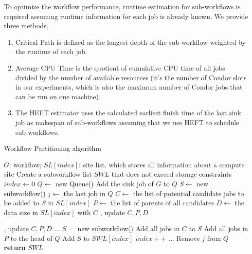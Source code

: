 To optimize the workflow performance, runtime estimation for sub-workflows is required assuming runtime information for each job is already known. We provide three methods. 
\begin{enumerate}
\item Critical Path is defined as the longest depth of the sub-workflow weighted by the runtime of each job. 
\item Average CPU Time is the quotient of cumulative CPU time of all jobs divided by the number of available resources (it’s the number of Condor slots in our experiments, which is also the maximum number of Condor jobs that can be run on one machine). \item The HEFT estimator uses the calculated earliest finish time of the last sink job as makespan of sub-workflows assuming that we use HEFT to schedule sub-workflows. 
\end{enumerate}

\begin{algorithm}[h!]
\caption{Workflow Partitioning algorithm}
\label{alg:parworkflow}
\begin{algorithmic}[1]
\Require $G$: workflow; $SL[index]$: site list, which stores all information about a compute site
\Ensure Create a subworkflow list $SWL$ that does not exceed storage constraints
   \State $index\gets 0$
   \State $Q\gets$ new Queue()
   \State Add the sink job of $G$ to $Q$
   \State $S\gets$ new subworkflow()
      \State $j\gets$ the last job in $Q$
      \State {} 
      \State $C\gets$ the list of potential candidate jobs to be added to $S$ in $SL[index]$
      \State $P\gets$ the list of parents of all candidates
      \State $D\gets$ the data size in $SL[index]$ with $C$
         \State {}, update $C,P,D$
      
         \State {}, update $C,P,D$
      \EndIf
      \EndIf
	\State ...
         \State$S=$ new subworkflow()
      \EndIf
     \State Add all jobs in $C$ to $S$
     \State Add all jobs in $P$ to the head of $Q$
     \State Add $S$ to $SWL[index]$
         \State $index++$
      \EndIf
   \State ... 
   \State Remove $j$ from $Q$
   \EndWhile
   \State \textbf{return }$SWL$

\EndProcedure
\end{algorithmic}
\end{algorithm}


